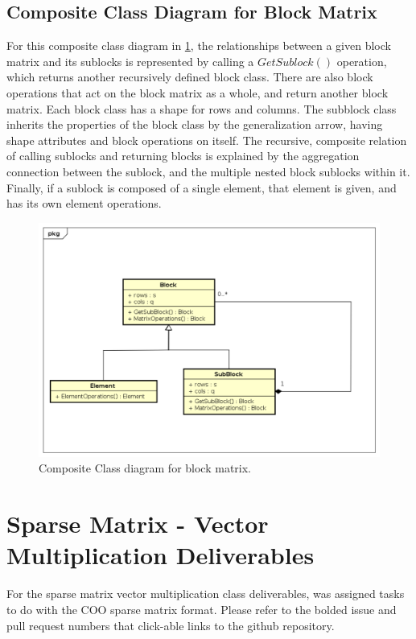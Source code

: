 \documentclass[12pt,letterpaper]{article}
\begin{document}
\subsection{Composite Class Diagram for Block Matrix}
For this composite class diagram in \cref{fig:blockmat}, the relationships between a given block matrix and its sublocks is represented by calling a $GetSublock()$ operation, which returns another recursively defined block class. There are also block operations that act on the block matrix as a whole, and return another block matrix. Each block class has a shape for rows and columns. The subblock class inherits the properties of the block class by the generalization arrow, having shape attributes and block operations on itself. The recursive, composite relation of calling sublocks and returning blocks is explained by the aggregation connection between the sublock, and the multiple nested block sublocks within it. Finally, if a sublock is composed of a single element, that element is given, and has its own element operations.
\begin{figure}[H]
  \centering
  \includegraphics[width=\textwidth]{figures/BlockMatrix.pdf}
  \caption{Composite Class diagram for block matrix.}
  \label{fig:blockmat}
\end{figure}




\newpage
\section{Sparse Matrix - Vector Multiplication Deliverables}
For the sparse matrix vector multiplication class deliverables, was assigned tasks to do with the COO sparse matrix format. Please refer to the bolded issue and pull request numbers that click-able links to the github repository.
\end{document}
